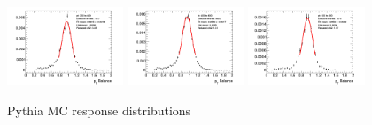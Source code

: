 \begin{figure}[htb!]
    \includegraphics[width=0.31\textwidth]{plots/insitu/fits_pythia_zmm_nominal/Zmmjet_Nominal_Bin8.png}
    \includegraphics[width=0.31\textwidth]{plots/insitu/fits_pythia_zmm_nominal/Zmmjet_Nominal_Bin9.png}
    \includegraphics[width=0.31\textwidth]{plots/insitu/fits_pythia_zmm_nominal/Zmmjet_Nominal_Bin10.png}
    \caption{Pythia MC \zmmjet response distributions \label{fig:App:zmmpythiafits}}
\end{figure}

